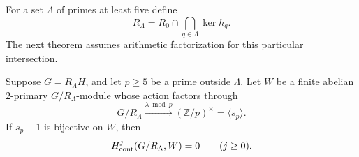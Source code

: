 For a set \(\Lambda\) of primes at least five define
\[
 R_\Lambda=R_0\cap\bigcap_{q\in\Lambda}\ker h_q.
\]
The next theorem assumes arithmetic factorization for this
particular intersection.

\begin{theorem}\label{thm:omitted-prime-vanishing}
Suppose \(G=R_\Lambda H\), and let \(p\ge5\) be a prime
outside \(\Lambda\).
Let \(W\) be a finite abelian \(2\)-primary
\(G/R_\Lambda\)-module whose action factors through
\[
 G/R_\Lambda\xrightarrow{\lambda\bmod p}
                  (\mathbb Z/p)^\times=\langle s_p\rangle.
\]
If \(s_p-1\) is bijective on \(W\), then
\begin{equation}
                  H^j_{\rm cont}(G/R_\Lambda,W)=0
                                     \qquad(j\ge0).
 \label{eq:omitted-prime-cohomology}
\end{equation}
\end{theorem}

